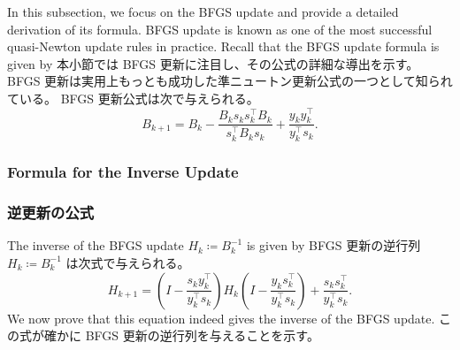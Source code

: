\documentclass[0_main]{subfiles}
\begin{document}
\ifEn
    In this subsection, we focus on the BFGS update and provide a detailed derivation of its formula.
    BFGS update is known as one of the most successful quasi-Newton update rules in practice.
    Recall that the BFGS update formula is given by
\else
    本小節では BFGS 更新に注目し、その公式の詳細な導出を示す。
    BFGS 更新は実用上もっとも成功した準ニュートン更新公式の一つとして知られている。
    BFGS 更新公式は次で与えられる。
\fi
\begin{equation*}
    B_{k+1}   = B_k - \frac{B_k s_k s_k^\top B_k}{s_k^\top B_k s_k} + \frac{y_k y_k^\top}{y_k^\top s_k}.
\end{equation*}

\ifEn
    \subsubsection{Formula for the Inverse Update}
\else
    \subsubsection{逆更新の公式}
\fi

\ifEn
    The inverse of the BFGS update $H_k \coloneqq B_k^{-1}$ is given by
\else
    BFGS 更新の逆行列 $H_k \coloneqq B_k^{-1}$ は次式で与えられる。
\fi
\begin{equation*}
    H_{k+1} = \left(I - \frac{s_k y_k^\top}{y_k^\top s_k}\right) H_k \left(I - \frac{y_k s_k^\top}{y_k^\top s_k}\right) + \frac{s_k s_k^\top}{y_k^\top s_k}.
\end{equation*}
\ifEn
    We now prove that this equation indeed gives the inverse of the BFGS update.
\else
    この式が確かに BFGS 更新の逆行列を与えることを示す。
\fi
\end{document}
